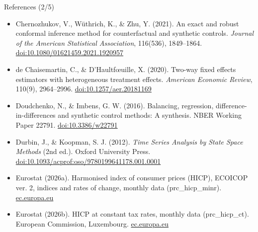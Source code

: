 \begin{frame}{References (2/5)}
\begin{itemize}
    \item Chernozhukov, V., Wüthrich, K., \& Zhu, Y. (2021). An exact and robust conformal inference method for counterfactual and synthetic controls. \textit{Journal of the American Statistical Association}, 116(536), 1849--1864. \href{https://doi.org/10.1080/01621459.2021.1920957}{doi:10.1080/01621459.2021.1920957}
    \item de Chaisemartin, C., \& D’Haultfœuille, X. (2020). Two-way fixed effects estimators with heterogeneous treatment effects. \textit{American Economic Review}, 110(9), 2964--2996. \href{https://doi.org/10.1257/aer.20181169}{doi:10.1257/aer.20181169}
    \item Doudchenko, N., \& Imbens, G. W. (2016). Balancing, regression, difference-in-differences and synthetic control methods: A synthesis. NBER Working Paper 22791. \href{https://doi.org/10.3386/w22791}{doi:10.3386/w22791}
    \item Durbin, J., \& Koopman, S. J. (2012). \textit{Time Series Analysis by State Space Methods} (2nd ed.). Oxford University Press. \href{https://doi.org/10.1093/acprof:oso/9780199641178.001.0001}{doi:10.1093/acprof:oso/9780199641178.001.0001}
    \item Eurostat (2026a). Harmonised index of consumer prices (HICP), ECOICOP ver. 2, indices and rates of change, monthly data (prc\_hicp\_minr). \href{https://ec.europa.eu/eurostat/databrowser/view/prc_hicp_minr/default/table}{ec.europa.eu}
    \item Eurostat (2026b). HICP at constant tax rates, monthly data (prc\_hicp\_ct). European Commission, Luxembourg. \href{https://ec.europa.eu/eurostat/databrowser/view/prc_hicp_ct/default/table}{ec.europa.eu}
\end{itemize}
\end{frame}

